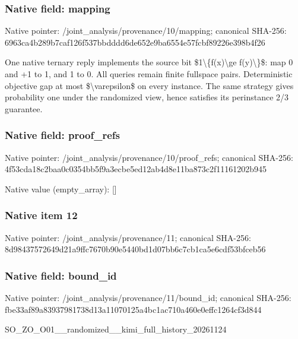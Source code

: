 \documentclass[10pt,a4paper]{article}
\begin{document}
\subsubsection{Native field: mapping}


Native pointer: /joint\_analysis/provenance/10/mapping; canonical SHA-256: 6963ca4b289b7caf126f537b\allowbreak{}bdddd6de652e9ba6554e57fc\allowbreak{}bf89226e398b4f26


One native ternary reply implements the source bit \$1\textbackslash{}\{f(x)\textbackslash{}ge f(y)\textbackslash{}\}\$: map 0 and +1 to 1, and 1 to 0. All queries remain finite fullspace pairs. Deterministic objective gap at most \$\textbackslash{}varepsilon\$ on every instance. The same strategy gives probability one under the randomized view, hence satisfies its perinstance 2/3 guarantee.


\subsubsection{Native field: proof\_refs}


Native pointer: /joint\_analysis/provenan\allowbreak{}ce/10/proof\_refs; canonical SHA-256: 4f53cda18c2baa0c0354bb5f\allowbreak{}9a3ecbe5ed12ab4d8e11ba87\allowbreak{}3c2f11161202b945



Native value (empty\_array): []



\subsubsection{Native item 12}


Native pointer: /joint\_analysis/provenance/11; canonical SHA-256: 8d98437572649d21a9ffc767\allowbreak{}0b90e5440bd1d07bb6c7cb1c\allowbreak{}a5e6cdf53bfceb56



\subsubsection{Native field: bound\_id}


Native pointer: /joint\_analysis/provenance/11/bound\_id; canonical SHA-256: fbe33af89a83937981738d13\allowbreak{}a11070125a4bc1ac710a460e\allowbreak{}0effc1264cf3d844


SO\_ZO\_O01\_\_randomized\_\_k\allowbreak{}imi\_full\_history\_2026112\allowbreak{}4
\end{document}
